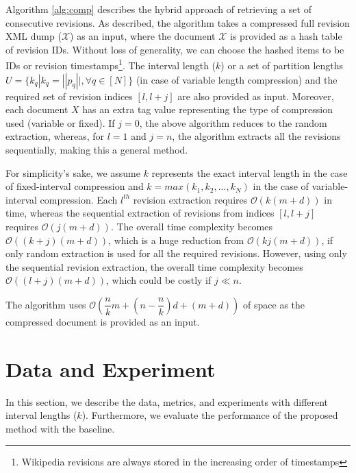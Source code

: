 \documentclass[acmsmall]{acmart}
\begin{document}
Algorithm \ref{alg:comp} describes the hybrid approach of retrieving a set of consecutive revisions. As described, the algorithm takes a compressed full revision XML dump ($\mathcal{X}$) as an input, where the document $\mathcal{X}$ is provided as a hash table of revision IDs. Without loss of generality, we can choose the hashed items to be IDs or revision timestamps\footnote{Wikipedia revisions are always stored in the increasing order of timestamps}. The interval length ($k$) or a set of partition lengths $U = \{k_q | k_q=||p_q||, \forall q \in [N]\}$ (in case of variable length compression) and the required set of revision indices $[l, l+j]$ are also provided as input. Moreover, each document $X$ has an extra tag value representing the type of compression used (variable or fixed). If $j = 0$, the above algorithm reduces to the random extraction, whereas, for $l=1$ and $j=n$, the algorithm extracts all the revisions sequentially, making this a general method. 

For simplicity's sake, we assume $k$ represents the exact interval length in the case of fixed-interval compression and $k = max(k_1, k_2, ..., k_N)$ in the case of variable-interval compression. Each $l^{th}$ revision extraction requires $\mathcal{O}(k(m+d))$ in time, whereas the sequential extraction of revisions from indices $[l, l+j]$ requires $\mathcal{O}(j(m+d))$. The overall time complexity becomes $\mathcal{O}((k+j)(m+d))$, which is a huge reduction from $\mathcal{O}(kj(m+d))$, if only random extraction is used for all the required revisions. However, using only the sequential revision extraction, the overall time complexity becomes $\mathcal{O}((l+j)(m+d))$, which could be costly if $j \ll n$.
  
The algorithm uses $\mathcal{O}\left(\dfrac{n}{k}m + \left(n-\dfrac{n}{k}\right)d + (m+d)\right)$ of space as the compressed document is provided as an input.



\section{Data and Experiment}
In this section, we describe the data, metrics, and experiments with different interval lengths ($k$). Furthermore, we evaluate the performance of the proposed method with the baseline.

\begin{table}[th]
\centering
\caption{Number of articles sampled from each class}
\label{fig:class}
\end{table}
\end{document}
